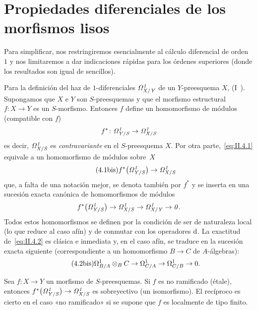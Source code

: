 
\section{Propiedades diferenciales de los morfismos lisos}
\label{II.4}
Para simplificar, nos restringiremos esencialmente al cálculo diferencial de orden~$1$ y nos limitaremos a dar indicaciones rápidas para los órdenes superiores (donde los resultados son igual de sencillos).

Para la definición del haz de $1$-diferenciales $\it{\Omega}^1_{X/Y}$ de un $Y$-preesquema $X$, \cf (I~\No{}). Supongamos que $X$ e $Y$ son $S$-preesquemas y que el morfismo estructural $f\colon X\to Y$ es un $S$-morfismo. Entonces $f$ define un homomorfismo de módulos (compatible con $f$)
\begin{equation}
\label{eq:II.4.1}
{f^*\colon \it{\Omega}^1_{Y/S}\to\it{\Omega}^1_{X/S}}
\end{equation}
es decir, $\it{\Omega}^1_{X/S}$ es \emph{contravariante} en el $S$-preesquema $X$. Por otra parte,~\eqref{eq:II.4.1} equivale a un homomorfismo de módulos sobre~$X$
\begin{equation*}
\label{eq:II.4.1bis}
\tag{4.1\textrm{bis}}
{f^*\big(\it{\Omega}^1_{Y/S}\big)\to\it{\Omega}^1_{X/S}}
\end{equation*}
que, a falta de una notación mejor, se denota también por $f^*$ y se inserta en una sucesión exacta canónica de homomorfismos de módulos
\begin{equation}
\label{eq:II.4.2}
{f^*\big(\it{\Omega}^1_{Y/S}\big)\to
\it{\Omega}^1_{X/S}\to\it{\Omega}^1_{X/Y}\to 0}.
\end{equation}
Todos estos homomorfismos se definen por la condición de ser de naturaleza local (lo que reduce al caso afín) y de conmutar con los operadores $\mathrm{d}$. La exactitud de~\eqref{eq:II.4.2} es clásica e inmediata y, en el caso afín, se traduce en la sucesión exacta siguiente (correspondiente a un homomorfismo $B\to C$ de $A$-álgebras):
\begin{equation*}
\label{eq:II.4.2bis}
\tag{4.2\textrm{bis}}
{\Omega^1_{B/A}\otimes_B C\to\Omega^1_{C/A}\to\Omega^1_{C/B}\to 0}.
\end{equation*}

\begin{lemme}
\label{II.4.1}
Sea
$f\colon X\to Y$ un morfismo de $S$-preesquemas. Si $f$ es no ramificado (\resp étale), entonces
$f^*\big(\it{\Omega}^1_{Y/S}\big)\to\it{\Omega}^1_{X/S}$
es sobreyectivo (\resp un isomorfismo). El recíproco es cierto en el caso «no ramificado» si se supone que $f$ es localmente de tipo finito.
\end{lemme}

